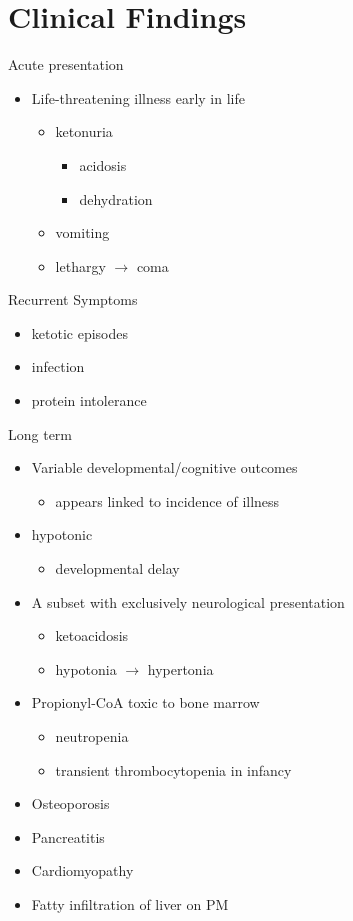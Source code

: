 \documentclass[presentation, smaller]{beamer}
\begin{document}
\section{Clinical Findings}
\label{sec:orgheadline23}
\begin{frame}[label={sec:orgheadline18}]{Acute presentation}
\begin{itemize}
\item Life-threatening illness early in life
\begin{itemize}
\item ketonuria
\begin{itemize}
\item acidosis
\item dehydration
\end{itemize}
\item vomiting
\item lethargy \(\to\) coma
\end{itemize}
\end{itemize}
\end{frame}

\begin{frame}[label={sec:orgheadline19}]{Recurrent Symptoms}
\begin{itemize}
\item ketotic episodes
\item infection
\item protein intolerance
\end{itemize}
\end{frame}

\begin{frame}[label={sec:orgheadline20}]{Long term}
\begin{itemize}
\item Variable developmental/cognitive outcomes
\begin{itemize}
\item appears linked to incidence of illness
\end{itemize}
\item hypotonic
\begin{itemize}
\item developmental delay
\end{itemize}
\item A subset with exclusively neurological presentation
\begin{itemize}
\item \textpm{} ketoacidosis
\item hypotonia \(\to\) hypertonia
\end{itemize}
\item Propionyl-CoA toxic to bone marrow
\begin{itemize}
\item neutropenia
\item transient thrombocytopenia in infancy
\end{itemize}
\item Osteoporosis
\item Pancreatitis
\item Cardiomyopathy
\item Fatty infiltration of liver on PM
\end{itemize}
\end{frame}
\end{document}
